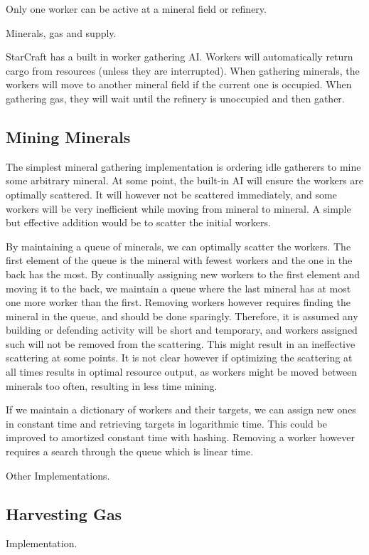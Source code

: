 Only one worker can be active at a mineral field or refinery.

Minerals, gas and supply.

StarCraft has a built in worker gathering AI. Workers will automatically return cargo from resources (unless they are interrupted). When gathering minerals, the workers will move to another mineral field if the current one is occupied. When gathering gas, they will wait until the refinery is unoccupied and then gather.

	\subsection*{Mining Minerals}
	The simplest mineral gathering implementation is ordering idle gatherers to mine some arbitrary mineral. At some point, the built-in AI will ensure the workers are optimally scattered. It will however not be scattered immediately, and some workers will be very inefficient while moving from mineral to mineral. A simple but effective addition would be to scatter the initial workers.
	
	By maintaining a queue of minerals, we can optimally scatter the workers. The first element of the queue is the mineral with fewest workers and the one in the back has the most. By continually assigning new workers to the first element and moving it to the back, we maintain a queue where the last mineral has at most one more worker than the first. Removing workers however requires finding the mineral in the queue, and should be done sparingly. Therefore, it is assumed any building or defending activity will be short and temporary, and workers assigned such will not be removed from the scattering. This might result in an ineffective scattering at some points. It is not clear however if optimizing the scattering at all times results in optimal resource output, as workers might be moved between minerals too often, resulting in less time mining.
	
	If we maintain a dictionary of workers and their targets, we can assign new ones in constant time and retrieving targets in logarithmic time. This could be improved to amortized constant time with hashing. Removing a worker however requires a search through the queue which is linear time.

	Other Implementations.

	\subsection*{Harvesting Gas}	
	Implementation.
	

